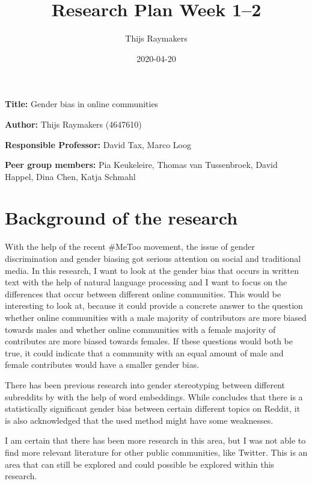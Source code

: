 \documentclass[english, a4paper, 11pt]{article}
\title{Research Plan Week 1--2}
\author{Thijs Raymakers}
\date{2020-04-20}
\newcommand{\namelistlabel}[1]{\mbox{#1}\hfil}
\newenvironment{namelist}[1]{%
\begin{list}{}
    {
        \let\makelabel\namelistlabel
        \settowidth{\labelwidth}{#1}
        \setlength{\leftmargin}{1.1\labelwidth}
    }
  }{%
\end{list}}
\begin{document}
\maketitle

\begin{namelist}{xxxxxxxxxxxxxxxxxxxxxxxxxxxxxxxxxxxxxxx}
\item[{\bf Title:}]
    Gender bias in online communities
\item[{\bf Author:}]
    Thijs Raymakers (4647610)
\item[{\bf Responsible Professor:}]
    David Tax, Marco Loog
\item[{\bf Peer group members:}]
    Pia Keukeleire, 
    Thomas van Tussenbroek,
    David Happel,
    Dina Chen,
    Katja Schmahl
\end{namelist}


\section*{Background of the research}
With the help of the recent \#MeToo movement, the issue of gender discrimination and 
gender biasing got serious attention on social and traditional media. In this research,
I want to look at the gender bias that occurs in written text with the help of natural
language processing and I want to focus on the differences that occur between different
online communities.
This would be interesting to look at, because it could provide a concrete answer to the
question whether online communities with a male majority of contributors are more biased 
towards males and whether online communities with a female majority of contributes are 
more biased towards females. If these questions would both be true, it could indicate that 
a community with an equal amount of male and female contributes would have a smaller
gender bias.

There has been previous research into gender stereotyping between different subreddits by \cite{kohn_2018_gender} with the help of word embeddings.  While \cite{kohn_2018_gender}
concludes that there is a statistically significant gender bias between certain different 
topics on Reddit, it is also acknowledged that the used method might have some weaknesses.

I am certain that there has been more research in this area, but I was not able to find
more relevant literature for other public communities, like Twitter. This is an area that
can still be explored and could possible be explored within this research.
\end{document}
